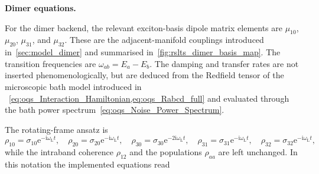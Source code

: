 \noindent\textbf{Dimer equations.}

For the dimer backend, the relevant exciton-basis dipole matrix elements are
\(\mu_{10}\), \(\mu_{20}\), \(\mu_{31}\), and \(\mu_{32}\). These are the
adjacent-manifold couplings introduced in~\autoref{sec:model_dimer} and
summarised in~\autoref{fig:rslts_dimer_basis_map}. The transition frequencies
are \(\omega_{ab}=E_a-E_b\). The damping and transfer rates are not inserted
phenomenologically, but are deduced from the Redfield tensor of the microscopic
bath model introduced in
~\cref{eq:oqs_Interaction_Hamiltonian,eq:oqs_Rabcd_full} and evaluated through
the bath power spectrum~\cref{eq:oqs_Noise_Power_Spectrum}.

The rotating-frame ansatz is
\[
\rho_{10}=\sigma_{10}\mathrm{e}^{-\mathrm{i}\omega_{\mathrm{L}} t},
\quad
\rho_{20}=\sigma_{20}\mathrm{e}^{-\mathrm{i}\omega_{\mathrm{L}} t},
\quad
\rho_{30}=\sigma_{30}\mathrm{e}^{-2\mathrm{i}\omega_{\mathrm{L}} t},
\quad
\rho_{31}=\sigma_{31}\mathrm{e}^{-\mathrm{i}\omega_{\mathrm{L}} t},
\quad
\rho_{32}=\sigma_{32}\mathrm{e}^{-\mathrm{i}\omega_{\mathrm{L}} t},
\]
while the intraband coherence \(\rho_{12}\) and the populations \(\rho_{aa}\)
are left unchanged. In this notation the implemented equations read
